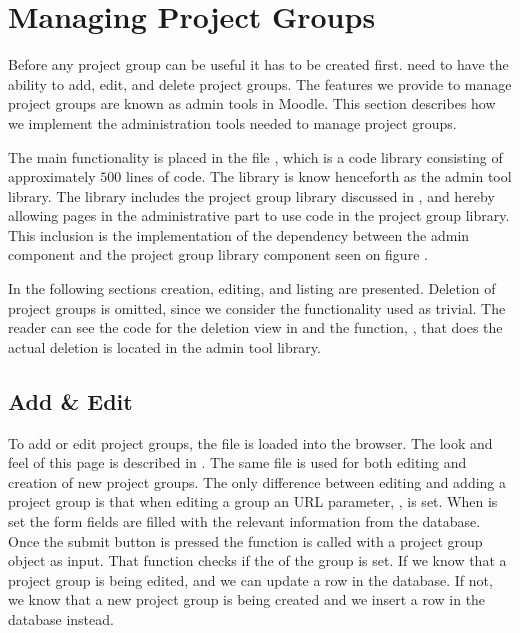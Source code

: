 \section{Managing Project Groups} %
\label{sec:manProjGrpImpl}
Before any project group can be useful it has to be created first.
\admpers{} need to have the ability to add, edit, and delete project groups.
The features we provide to manage project groups are known as admin tools in Moodle.
This section describes how we implement the administration tools needed to manage project groups.


The main functionality is placed in the file , which is a code library consisting of approximately $500$ lines of code. 
The library is know henceforth as the admin tool library.
The library includes the project group library discussed in , and hereby allowing pages in the administrative part to use code in the project group library. 
This inclusion is the implementation of the dependency between the admin component and the project group library component seen on figure . 

In the following sections creation, editing, and listing are presented. 
Deletion of project groups is omitted, since we consider the functionality used as trivial. 
The reader can see the code for the deletion view in  and the function, , that does the actual deletion is located in the admin tool library.

\subsection{Add \& Edit}
\label{sub:addedditprojectgroups}
To add or edit project groups, the file  is loaded into the browser. 
The look and feel of this page is described in .
The same file is used for both editing and creation of new project groups. 
The only difference between editing and adding a project group is that when editing a group an URL parameter, , is set.
When  is set the form fields are filled with the relevant information from the database.
Once the submit button is pressed the function  is called with a project group object as input.
That function checks if the  of the group is set. 
If we know that a project group is being edited, and we can update a row in the database.
If not, we know that a new project group is being created and we insert a row in the database instead.

